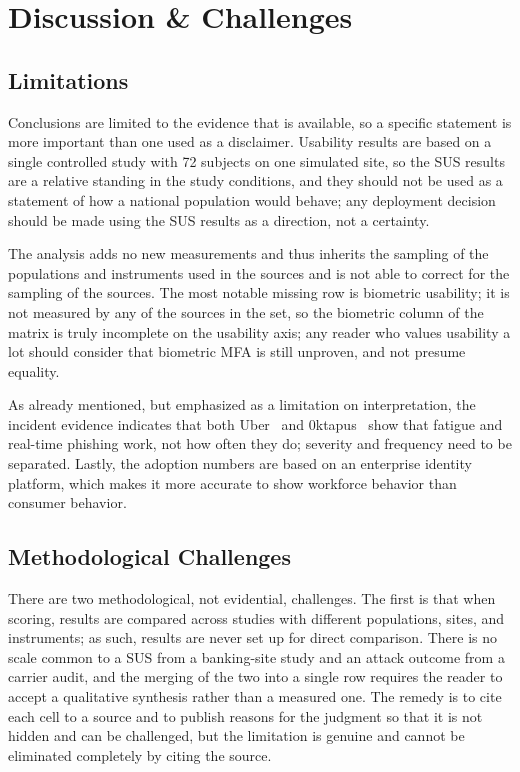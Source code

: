 \documentclass[sigconf]{acmart}
\begin{document}
\section{Discussion \& Challenges}

\subsection{Limitations}

Conclusions are limited to the evidence that is available, so a specific statement is more important than one used as a disclaimer. Usability results are based on a single controlled study with 72 subjects on one simulated site, so the SUS results are a relative standing in the study conditions, and they should not be used as a statement of how a national population would behave; any deployment decision should be made using the SUS results as a direction, not a certainty.

The analysis adds no new measurements and thus inherits the sampling of the populations and instruments used in the sources and is not able to correct for the sampling of the sources. The most notable missing row is biometric usability; it is not measured by any of the sources in the set, so the biometric column of the matrix is truly incomplete on the usability axis; any reader who values usability a lot should consider that biometric MFA is still unproven, and not presume equality.

As already mentioned, but emphasized as a limitation on interpretation, the incident evidence indicates that both Uber~\cite{uber:2022:security} and 0ktapus~\cite{groupib:2022:0ktapus} show that fatigue and real-time phishing work, not how often they do; severity and frequency need to be separated. Lastly, the adoption numbers are based on an enterprise identity platform, which makes it more accurate to show workforce behavior than consumer behavior.

\subsection{Methodological Challenges}

There are two methodological, not evidential, challenges. The first is that when scoring, results are compared across studies with different populations, sites, and instruments; as such, results are never set up for direct comparison. There is no scale common to a SUS from a banking-site study and an attack outcome from a carrier audit, and the merging of the two into a single row requires the reader to accept a qualitative synthesis rather than a measured one. The remedy is to cite each cell to a source and to publish reasons for the judgment so that it is not hidden and can be challenged, but the limitation is genuine and cannot be eliminated completely by citing the source.
\end{document}
